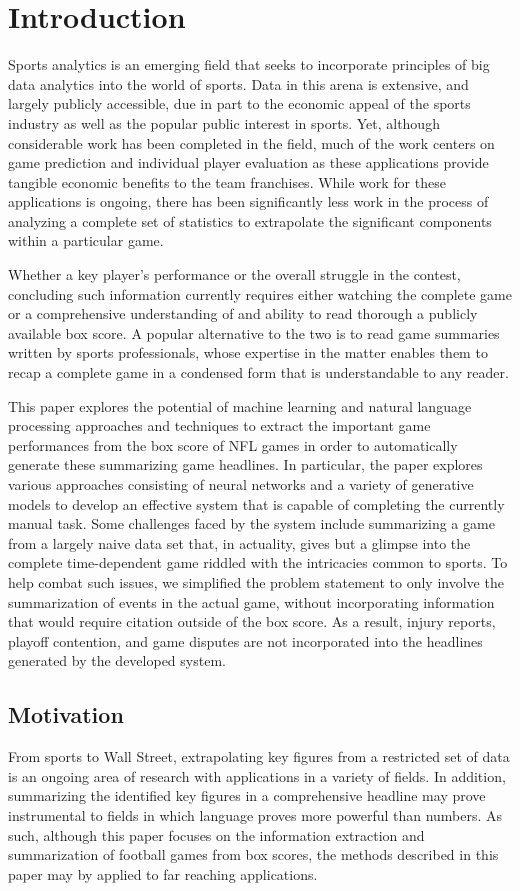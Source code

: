 \documentclass[12pt, journal]{IEEEtran}
\begin{document}
\section{Introduction}
Sports analytics is an emerging field that seeks to incorporate principles of big data analytics into the world of sports. Data in this arena is extensive, and largely publicly accessible, due in part to the economic appeal of the sports industry as well as the popular public interest in sports. Yet, although considerable work has been completed in the field, much of the work centers on game prediction and individual player evaluation as these applications provide tangible economic benefits to the team franchises. While work for these applications is ongoing, there has been significantly less work in the process of analyzing a complete set of statistics to extrapolate the significant components within a particular game.

Whether a key player's performance or the overall struggle in the contest, concluding such information currently requires either watching the complete game or a comprehensive understanding of and ability to read thorough a publicly available box score. A popular alternative to the two is to read game summaries written by sports professionals, whose expertise in the matter enables them to recap a complete game in a condensed form that is understandable to any reader.

This paper explores the potential of machine learning and natural language processing approaches and techniques to extract the important game performances from the box score of NFL games in order to automatically generate these summarizing game headlines. In particular, the paper explores various approaches consisting of neural networks and a variety of generative models to develop an effective system that is capable of completing the currently manual task. Some challenges faced by the system include summarizing a game from a largely naive data set that, in actuality, gives but a glimpse into the complete time-dependent game riddled with the intricacies common to sports. To help combat such issues, we simplified the problem statement to only involve the summarization of events in the actual game, without incorporating information that would require citation outside of the box score. As a result, injury reports, playoff contention, and game disputes are not incorporated into the headlines generated by the developed system.

\subsection{Motivation}
From sports to Wall Street, extrapolating key figures from a restricted set of data is an ongoing area of research with applications in a variety of fields. In addition, summarizing the identified key figures in a comprehensive headline may prove instrumental to fields in which language proves more powerful than numbers. As such, although this paper focuses on the information extraction and summarization of football games from box scores, the methods described in this paper may by applied to far reaching applications.
\end{document}
